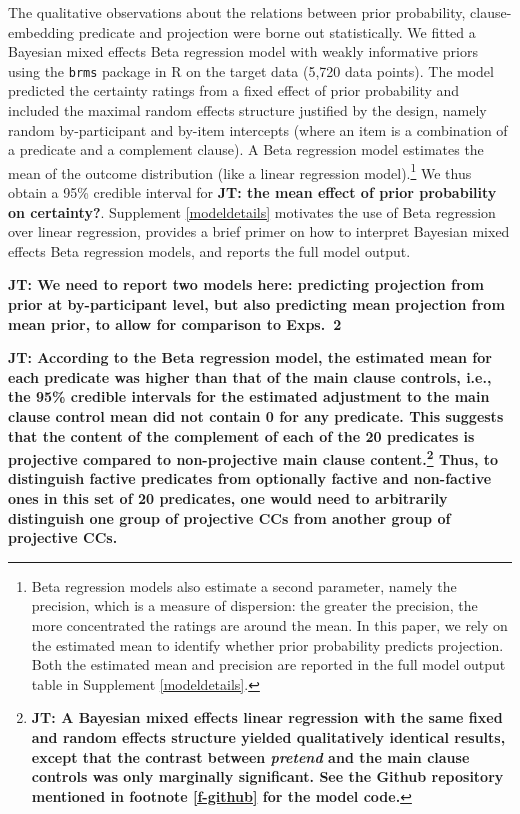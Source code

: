 \documentclass[11pt,fleqn]{article}
\newcommand{\6}{\mbox{$[\hspace*{-.6mm}[$}}
\newcommand{\9}{\mbox{$]\hspace*{-.6mm}]$}}
\newcommand{\jt}[1]{\textbf{\color{blue}JT: #1}}
\begin{document}
\newpage

The qualitative observations about the relations between prior probability, clause-embedding predicate and projection were borne out statistically. We fitted a Bayesian mixed effects Beta regression model  with weakly informative priors using the \verb|brms| \citep{buerkner2017}  package in R \citep{R} on the target data (5,720 data points). The model predicted the certainty ratings from a fixed effect of prior probability and included the maximal random effects structure justified by the design, namely random by-participant and by-item intercepts (where an item is a combination of a predicate and a complement clause). A Beta regression model estimates the mean of the outcome distribution (like a linear regression model).\footnote{Beta regression models also estimate a second parameter, namely the precision, which is a measure of dispersion: the greater the precision, the more concentrated the ratings are around the mean. In this paper, we rely on the estimated mean to identify whether prior probability predicts projection. Both the estimated mean and precision are reported in the full model output table in Supplement \ref{modeldetails}.} We thus obtain a 95\% credible interval for \jt{the mean effect of prior probability on certainty?}. Supplement \ref{modeldetails} motivates the use of Beta regression over linear regression, provides a brief primer on how to interpret Bayesian mixed effects Beta regression models, and reports the full model output.

\jt{We need to report two models here: predicting projection from prior at by-participant level, but also predicting mean projection from mean prior, to allow for comparison to Exps.~2}

\jt{According to the Beta regression model, the estimated mean for each predicate was higher than that of the main clause controls, i.e., the 95\% credible intervals for the estimated adjustment to the main clause control mean did not contain 0 for any predicate. This suggests that the content of the complement of each of the 20 predicates is projective compared to non-projective main clause content.\footnote{\jt{A Bayesian mixed effects linear regression with the same fixed and random effects structure yielded qualitatively identical results, except that the contrast between \emph{pretend} and the main clause controls was only marginally significant. See the Github repository mentioned in footnote \ref{f-github} for the model code.}} Thus, to distinguish factive predicates from optionally factive and non-factive ones in this set of 20 predicates, one would need to arbitrarily distinguish one group of projective CCs from another group of projective CCs.} 
\end{document}
